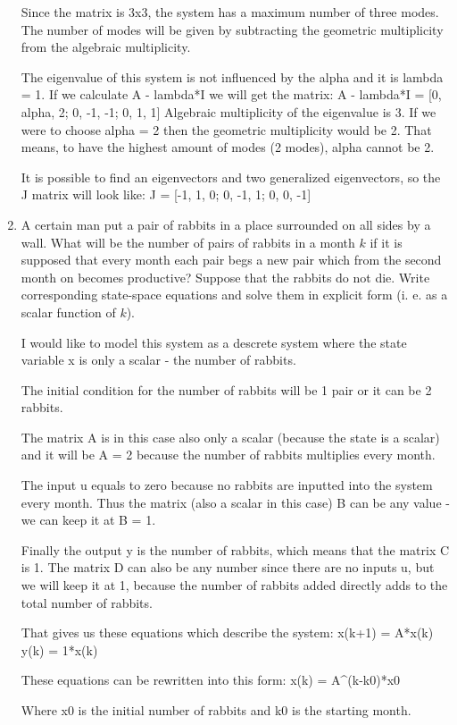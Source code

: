 \documentclass[10pt]{article} %
\begin{document}
\begin{enumerate}
Since the matrix is 3x3, the system has a maximum number of three modes. The number of modes will be given by subtracting the geometric multiplicity from the algebraic multiplicity.

The eigenvalue of this system is not influenced by the alpha and it is lambda = 1. If we calculate A - lambda*I we will get the matrix:
A - lambda*I = [0, alpha, 2; 0, -1, -1; 0, 1, 1]
Algebraic multiplicity of the eigenvalue is 3.
If we were to choose alpha = 2 then the geometric multiplicity would be 2. That means, to have the highest amount of modes (2 modes), alpha cannot be 2.

It is possible to find an eigenvectors and two generalized eigenvectors, so the J matrix will look like:
J = [-1, 1, 0; 0, -1, 1; 0, 0, -1]

\item A certain man put a pair of rabbits in a place surrounded on all sides by a wall.
What will be the number of pairs of rabbits in a month $k$ if it is supposed that every month each pair begs a new pair which from the second month
on becomes productive? Suppose that the rabbits do not die. Write corresponding state-space equations and solve them in explicit form (i. e. as a scalar function of $k$).

I would like to model this system as a descrete system where the state variable x is only a scalar - the number of rabbits.

The initial condition for the number of rabbits will be 1 pair or it can be 2 rabbits.

The matrix A is in this case also only a scalar (because the state is a scalar) and it will be A = 2 because the number of rabbits multiplies every month.

The input u equals to zero because no rabbits are inputted into the system every month. Thus the matrix (also a scalar in this case) B can be any value - we can keep it at B = 1.

Finally the output y is the number of rabbits, which means that the matrix C is 1. The matrix D can also be any number since there are no inputs u, but we will keep it at 1, because the number of rabbits added directly adds to the total number of rabbits.

That gives us these equations which describe the system:
x(k+1) = A*x(k)
y(k) = 1*x(k)

These equations can be rewritten into this form:
x(k) = A^(k-k0)*x0

Where x0 is the initial number of rabbits and k0 is the starting month.

\end{enumerate}
\end{document}
